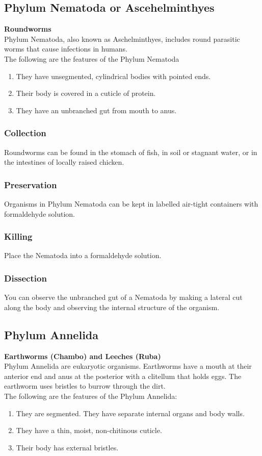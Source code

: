 \subsection{Phylum Nematoda or Ascehelminthyes}
\textbf{Roundworms}\\
Phylum Nematoda, also known as Aschelminthyes, includes round parasitic worms that cause infections in humans.\\
The following are the features of the Phylum Nematoda 
\begin{enumerate}
\item{They have unsegmented, cylindrical bodies with pointed ends.}
\item{Their body is covered in a cuticle of protein.}
\item{They have an unbranched gut from mouth to anus.}
\end{enumerate}

\subsubsection{Collection}
Roundworms can be found in the stomach of fish, in soil or stagnant water, or in the intestines of locally raised chicken.

\subsubsection{Preservation} 
Organisms in Phylum Nematoda can be kept in labelled air-tight containers with formaldehyde solution.

\subsubsection{Killing}
Place the Nematoda into a formaldehyde solution.

\subsubsection{Dissection}
You can observe the unbranched gut of a Nematoda by making a lateral cut along the body and observing the internal structure of the organism.

\subsection{Phylum Annelida}
\textbf{Earthworms (Chambo) and Leeches (Ruba)}\\ 
Phylum Annelida are eukaryotic organisms. Earthworms have a mouth at their anterior end and anus at the posterior with a clitellum that holds eggs. The earthworm uses bristles to burrow through the dirt. \\
The following are the features of the Phylum Annelida:
\begin{enumerate}
\item{They are segmented. They have separate internal organs and body walls.}
\item{They have a thin, moist, non-chitinous cuticle.}
\item{Their body has external bristles.}
\end{enumerate}

